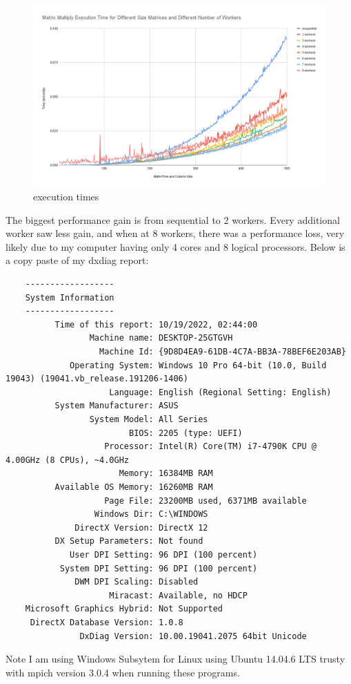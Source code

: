 \documentclass[12pt]{report}
\begin{document}
\begin{figure}[ht]
    \centering
    \includegraphics[width=\textwidth]{avgtimes}
    \caption{execution times}
\end{figure}

The biggest performance gain is from sequential to 2 workers. Every additional worker saw less gain, and when at 8 workers, there was a performance loss,
very likely due to my computer having only 4 cores and 8 logical processors. Below is a copy paste of my dxdiag report:
\pagebreak
\begin{verbatim}
    ------------------
    System Information
    ------------------
          Time of this report: 10/19/2022, 02:44:00
                 Machine name: DESKTOP-25GTGVH
                   Machine Id: {9D8D4EA9-61DB-4C7A-BB3A-78BEF6E203AB}
             Operating System: Windows 10 Pro 64-bit (10.0, Build 19043) (19041.vb_release.191206-1406)
                     Language: English (Regional Setting: English)
          System Manufacturer: ASUS
                 System Model: All Series
                         BIOS: 2205 (type: UEFI)
                    Processor: Intel(R) Core(TM) i7-4790K CPU @ 4.00GHz (8 CPUs), ~4.0GHz
                       Memory: 16384MB RAM
          Available OS Memory: 16260MB RAM
                    Page File: 23200MB used, 6371MB available
                  Windows Dir: C:\WINDOWS
              DirectX Version: DirectX 12
          DX Setup Parameters: Not found
             User DPI Setting: 96 DPI (100 percent)
           System DPI Setting: 96 DPI (100 percent)
              DWM DPI Scaling: Disabled
                     Miracast: Available, no HDCP
    Microsoft Graphics Hybrid: Not Supported
     DirectX Database Version: 1.0.8
               DxDiag Version: 10.00.19041.2075 64bit Unicode
\end{verbatim}

Note I am using Windows Subsytem for Linux using Ubuntu 14.04.6 LTS trusty with mpich version 3.0.4 when running these programs.




 
\end{document}
